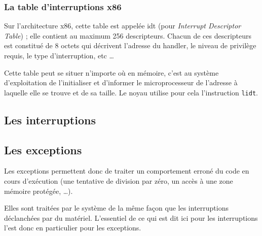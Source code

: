 \begin{itemize}
%
\subsubsection{La table d'interruptions x86}

   Sur l'architecture x86, cette table est appelée {\sc idt} (pour
{\em Interrupt Descriptor Table}) ; elle contient au maximum 256
descripteurs. Chacun de ces descripteurs est constitué de 8 octets qui
décrivent l'adresse du handler, le niveau de privilège requis, le type
d'interruption, etc \ldots

   Cette table peut se situer n'importe où en mémoire, c'est au
système d'exploitation de l'initialiser et d'informer le
microprocesseur de l'adresse à laquelle elle se trouve et de sa
taille. Le noyau utilise pour cela l'instruction {\tt lidt}.


%
\subsection{Les interruptions}

%
\subsection{Les exceptions}

   Les exceptions permettent donc de traiter un comportement erroné du
code en cours d'exécution (une tentative de division par zéro, un
accès à une zone mémoire protégée, \ldots).

   Elles sont traitées par le système de la même façon que les
interruptions déclanchées par du matériel. L'essentiel de ce qui est
dit ici pour les interruptions l'est donc en particulier pour les
exceptions.

%

\end{itemize}
